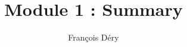 \documentclass[11pt, english]{memoir}
\numberwithin{definition}{section}
\begin{document}
	
\title{Module 1 : Summary}
\date{}
\author{François Déry}
\maketitle

	
	
	
	
	
	
	
	
	
	
	
	
	
	
	
	
	
	
	
	
	
	
	
	
	
	
	
	
	
	
	
	
	
	
	
	
	
	
	
	
	
	
	
	
	
	
	
	
	
	
	
	
	
	
	
	
	
\end{document}
